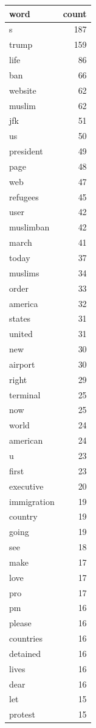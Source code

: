 \begin{tabular}{lr}
\toprule
word & count \\
\midrule
s & 187 \\
trump & 159 \\
life & 86 \\
ban & 66 \\
website & 62 \\
muslim & 62 \\
jfk & 51 \\
us & 50 \\
president & 49 \\
page & 48 \\
web & 47 \\
refugees & 45 \\
user & 42 \\
muslimban & 42 \\
march & 41 \\
today & 37 \\
muslims & 34 \\
order & 33 \\
america & 32 \\
states & 31 \\
united & 31 \\
new & 30 \\
airport & 30 \\
right & 29 \\
terminal & 25 \\
now & 25 \\
world & 24 \\
american & 24 \\
u & 23 \\
first & 23 \\
executive & 20 \\
immigration & 19 \\
country & 19 \\
going & 19 \\
see & 18 \\
make & 17 \\
love & 17 \\
pro & 17 \\
pm & 16 \\
please & 16 \\
countries & 16 \\
detained & 16 \\
lives & 16 \\
dear & 16 \\
let & 15 \\
protest & 15 \\

\end{tabular}
